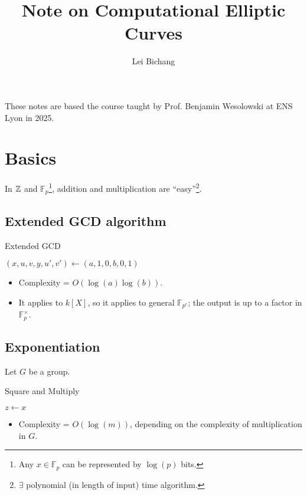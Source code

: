 \documentclass{article}
\title{Note on Computational Elliptic Curves}
\author{Lei Bichang}
\newcommand{\F}{\mathbb{F}}
\begin{document}
\maketitle

These notes are based the course taught by Prof. Benjamin Wesolowski at ENS Lyon in 2025.

\section*{Basics}

In $\mathbb{Z}$ and $\F_p$\footnote{
    Any $x\in\F_p$ can be represented by $\log(p)$ bits.
}, addition and multiplication are ``easy''\footnote{$\exists$ polynomial (in length of input) time algorithm.}.
\subsection*{Extended GCD algorithm}
\begin{algorithm}[H]
    \caption{Extended GCD}\label{alg: ExtGCD}
    $(x, u, v, y, u', v')\gets (a, 1, 0, b, 0, 1)$\\
\end{algorithm}
\begin{itemize}
    \item Complexity = $O(\log(a)\log(b))$.
    \item It applies to $k[X]$, so it applies to general $\F_{p^r}$; the output is up to a factor in $\F_p^\times$.
\end{itemize}
\subsection*{Exponentiation}
Let $G$ be a group.

\begin{algorithm}[H]
    \caption{Square and Multiply}\label{alg: exponential}
    $z\gets x$
\end{algorithm}
\begin{itemize}
    \item Complexity = $O(\log(m))$, depending on the complexity of multiplication in $G$.
\end{itemize}
\end{document}
